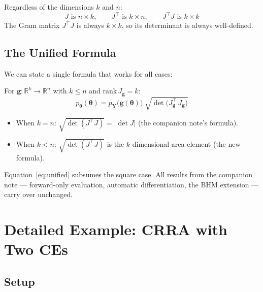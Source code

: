 \documentclass[11pt,a4paper]{article}
\theoremstyle{definition}
\newcommand{\btheta}{\boldsymbol{\theta}}
\begin{document}
\begin{keyresult}
Regardless of the dimensions $k$ and $n$:
\begin{equation}
    J \text{ is } n \times k, \qquad
    J^\top \text{ is } k \times n, \qquad
    J^\top J \text{ is } k \times k
\end{equation}
The Gram matrix $J^\top J$ is always $k \times k$, so its determinant is
always well-defined.
\end{keyresult}

\subsection{The Unified Formula}

We can state a single formula that works for all cases:

\begin{keyresult}
For $\mathbf{g}: \mathbb{R}^k \to \mathbb{R}^n$ with $k \leq n$ and
$\text{rank}\, J_{\mathbf{g}} = k$:
\begin{equation}
    \label{eq:unified}
    p_{\btheta}(\btheta) = p_{\mathbf{Y}}\!\big(\mathbf{g}(\btheta)\big) \;
    \sqrt{\det\!\big(J_{\mathbf{g}}^\top \, J_{\mathbf{g}}\big)}
\end{equation}
\begin{itemize}
    \item When $k = n$: $\sqrt{\det(J^\top J)} = |\!\det J|$ (the companion
    note's formula).
    \item When $k < n$: $\sqrt{\det(J^\top J)}$ is the $k$-dimensional area
    element (the new formula).
\end{itemize}
\end{keyresult}

Equation~\eqref{eq:unified} subsumes the square case. All results from the
companion note --- forward-only evaluation, automatic differentiation, the
BHM extension --- carry over unchanged.


\section{Detailed Example: CRRA with Two CEs}
\label{sec:crra}

\subsection{Setup}
\end{document}
